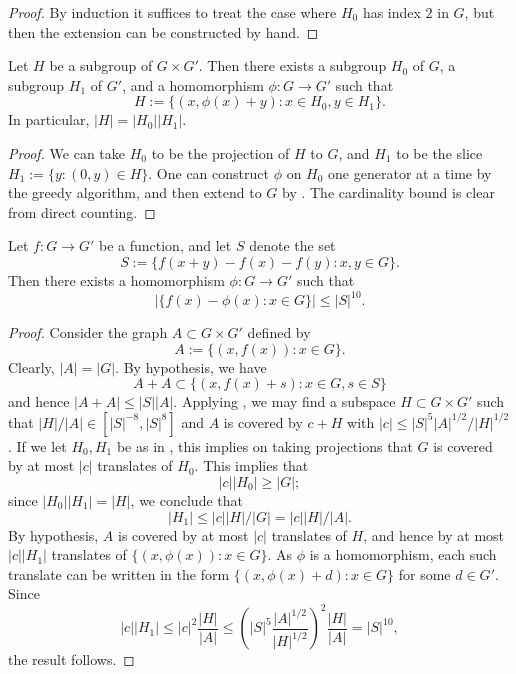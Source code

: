 \begin{proof}\leanok  By induction it suffices to treat the case where $H_0$ has index $2$ in $G$, but then the extension can be constructed by hand.
\end{proof}

\begin{lemma}\label{goursat}\leanok  Let $H$ be a subgroup of $G \times G'$.  Then there exists a subgroup $H_0$ of $G$, a subgroup $H_1$ of $G'$, and a homomorphism $\phi: G \to G'$ such that
$$ H := \{ (x, \phi(x) + y): x \in H_0, y \in H_1 \}.$$
In particular, $|H| = |H_0| |H_1|$.
\end{lemma}

\begin{proof}\leanok We can take $H_0$ to be the projection of $H$ to $G$, and $H_1$ to be the slice $H_1 := \{ y: (0,y) \in H \}$.  One can construct $\phi$ on $H_0$ one generator at a time by the greedy algorithm, and then extend to $G$ by .  The cardinality bound is clear from direct counting.
\end{proof}

\begin{theorem}\label{hom-pfr}\leanok  Let $f: G \to G'$ be a function, and let $S$ denote the set
$$ S := \{ f(x+y)-f(x)-f(y): x,y \in G \}.$$
Then there exists a homomorphism $\phi: G \to G'$ such that
$$ |\{ f(x) - \phi(x): x \in G \}| \leq |S|^{10}.$$
\end{theorem}

\begin{proof}\leanok
Consider the graph $A \subset G \times G'$ defined by
$$ A := \{ (x,f(x)): x \in G \}.$$
Clearly, $|A| = |G|$.  By hypothesis, we have
$$ A+A \subset \{ (x,f(x)+s): x \in G, s \in S\}$$
and hence $|A+A| \leq |S| |A|$.  Applying , we may find a
subspace $H \subset G \times G'$ such that $|H|/ |A| \in [|S|^{-8}, |S|^{8}]$
and $A$ is covered by $c + H$ with $|c| \le |S|^5|A|^{1/2} / |H|^{1/2}$. If
we let $H_0, H_1$ be as in , this implies on taking projections
that $G$ is covered by at most $|c|$ translates of $H_0$. This implies that
$$ |c| |H_0| \geq |G|;$$
since $|H_0| |H_1| = |H|$, we conclude that
$$ |H_1| \leq |c| |H|/|G| = |c| |H|/|A|.$$
By hypothesis, $A$ is covered by at most $|c|$ translates of $H$, and hence
by at most $|c| |H_1|$ translates of $\{ (x,\phi(x)): x \in G \}$. As $\phi$
is a homomorphism, each such translate can be written in the form $\{
(x,\phi(x)+d): x \in G \}$ for some $d \in G'$. Since
$$
|c| |H_1| \le |c|^2 \frac{|H|}{|A|} \le \left(|S|^5 \frac{|A|^{1/2}}{|H|^{1/2}}\right)^2 \frac{|H|}{|A|}
= |S|^{10},
$$
the result follows.
\end{proof}


